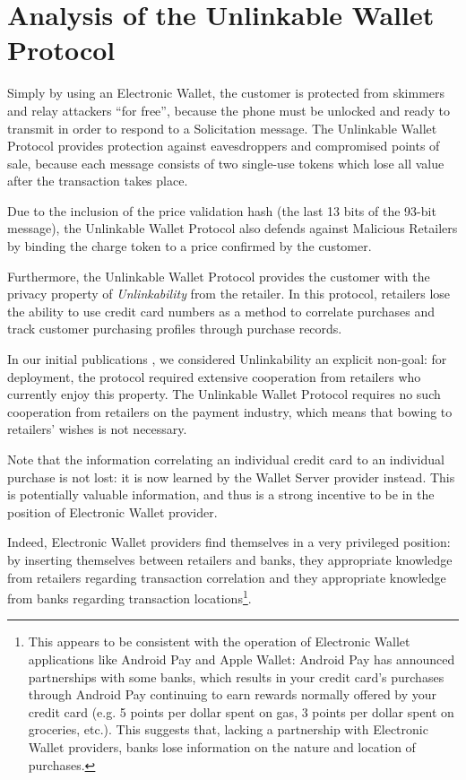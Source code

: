 \section{Analysis of the Unlinkable Wallet Protocol}
\label{sec:analysis}

Simply by using an Electronic Wallet, the customer is protected from skimmers and relay attackers ``for free'',
    because the phone must be unlocked and ready to transmit in order to respond to a Solicitation message.
The Unlinkable Wallet Protocol provides protection against eavesdroppers and compromised points of sale,
    because each message consists of two single-use tokens which lose all value after the transaction takes place.

Due to the inclusion of the price validation hash (the last 13 bits of the 93-bit message),
    the Unlinkable Wallet Protocol also defends against Malicious Retailers by binding the charge token to a price confirmed by the customer.

Furthermore, the Unlinkable Wallet Protocol provides the customer with the privacy property of \emph{Unlinkability} from the retailer.
In this protocol, retailers lose the ability to use credit card numbers as a method to correlate purchases and track customer purchasing profiles through purchase records.

In our initial publications \cite{sccp} \cite{???}, we considered Unlinkability an explicit non-goal:
  for deployment, the protocol required extensive cooperation from retailers who currently enjoy this property.
The Unlinkable Wallet Protocol requires no such cooperation from retailers on the payment industry,
    which means that bowing to retailers' wishes is not necessary.

Note that the information correlating an individual credit card to an individual purchase is not lost:
    it is now learned by the Wallet Server provider instead.
This is potentially valuable information, and thus is a strong incentive to be in the position of Electronic Wallet provider.

Indeed, Electronic Wallet providers find themselves in a very privileged position:
    by inserting themselves between retailers and banks, they appropriate knowledge from retailers regarding transaction correlation
    and they appropriate knowledge from banks regarding transaction locations\footnote{
This appears to be consistent with the operation of Electronic Wallet applications like Android Pay and Apple Wallet:
    Android Pay has announced partnerships with some banks,
    which results in your credit card's purchases through Android Pay continuing to earn rewards normally offered by your credit card
    (e.g. 5 points per dollar spent on gas, 3 points per dollar spent on groceries, etc.).
    This suggests that, lacking a partnership with Electronic Wallet providers, banks lose information on the nature and location of purchases.}.


